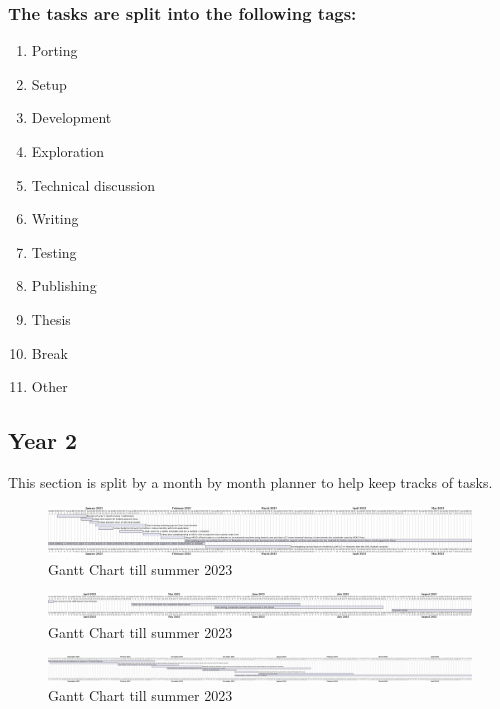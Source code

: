\subsubsection{The tasks are split into the following tags:}
\begin{enumerate}
  \item Porting 
  \item Setup
  \item Development
  \item Exploration 
  \item Technical discussion 
  \item Writing
  \item Testing
  \item Publishing
  \item Thesis
  \item Break
  \item Other
\end{enumerate}


\subsection{Year 2}
This section is split by a month by month planner to help keep tracks of tasks. 
\begin{figure}[htbp!] 
  \centering    
  \includegraphics[width=1.2\textwidth]{gnatt-1}
  \caption[Gantt Chart till summer 2023]{Gantt Chart till summer 2023}
  \label{fig:Gantt Chart}
  \end{figure}
  \begin{figure}[htbp!] 
    \centering    
    \includegraphics[width=1.2\textwidth]{gnatt-2}
    \caption[Gantt Chart till summer 2023]{Gantt Chart till summer 2023}
    \label{fig:Gantt Chart}
    \end{figure}
    \begin{figure}[htbp!] 
      \centering    
      \includegraphics[width=1.2\textwidth]{gnatt-3}
      \caption[Gantt Chart till summer 2023]{Gantt Chart till summer 2023}
      \label{fig:Gantt Chart}
      \end{figure}

